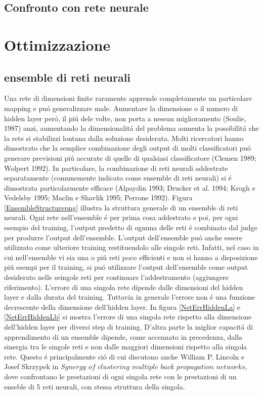 \documentclass[a4paper,10pt]{article}
\begin{document}
 \subsection{Confronto con rete neurale}
 
 \section{Ottimizzazione}
 \subsection{ensemble di reti neurali}
 Una rete di dimensioni finite raramente apprende completamente un particolare mapping e pu\'o generalizzare male. Aumentare la dimensione o il numero di hidden layer per\'o, il pi\'u dele volte, non porta a nessun miglioramento (Soulie, 1987) anzi, aumentando la dimensionalit\'a del problema aumenta la possibilit\'a che la rete si stabilizzi lontana dalla soluzione desiderata. 
 Molti ricercatori hanno dimostrato che la semplice combinazione degli output di molti classificatori pu\'o generare previsioni pi\'u accurate di quelle di qualsiasi classificatore (Clemen 1989; Wolpert 1992). In particolare, la combinazione di reti neurali addestrate separatamente (comunemente indicato come ensemble di reti neurali) si \'e dimostrata particolarmente efficace (Alpaydin 1993; Drucker et al. 1994; Krogh e Vedelsby 1995; Maclin e Shavlik 1995; Perrone 1992). 
 Figura \ref{EnsembleStructurepng} illustra la struttura generale di un ensemble di reti neurali. Ogni rete nell'ensemble \'e per prima cosa addestrato e poi, per ogni esempio del training, l'output predetto di ognuna delle reti \'e combinato dal judge per produrre l'output dell'ensemble. 
 L'output dell'ensemble pu\'o anche essere utilizzato come ulteriore training restituendolo alle singole reti. Infatti, nel caso in cui nell'ensemble vi sia una o pi\'u reti poco efficienti e non si hanno a disposizione pi\'u esempi per il training, si pu\'o utilizzare l'output dell'ensemble come output desiderato nelle seingole reti per continuare l'addestramento (aggiungere riferimento). 
 L'errore di una singola rete dipende dalle dimensioni del hidden layer e dalla durata del training. Tuttavia in generale l'errore non \'e una funzione decrescente della dimensione dell'hidden layer. In figura \ref{NetErrHiddenLa} e \ref{NetErrHiddenLb} si mostra l'errore di una singola rete rispetto alla dimensione dell'hidden layer per diversi step di training. D'altra parte la miglior capacit\'a di apprendimento di un ensemble dipende, come accennato in precedenza, dalla sinergia tra le singole reti e non dalle maggiori dimensioni rispetto alla singola rete. Questo \'e principalmente ci\'o di cui discutono anche William P. Lincoln e Josef Skrzypek in $Synergy$ $of$ $clustering$ $multiple$ $back$ $propagation$ $networks$, dove confrontano le prestazioni di ogni singola rete con le prestazioni di un enseble di 5 reti neurali, con stessa struttura della singola.
 
\end{document}
